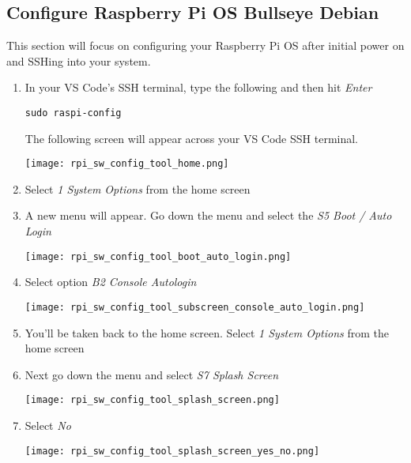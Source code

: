 \documentclass[journal]{IEEEtran}
\begin{document}
    \subsection{Configure Raspberry Pi OS Bullseye Debian}

    This section will focus on configuring your Raspberry Pi OS after initial power on and SSHing into your system. \newline

    \begin{enumerate}
        \item In your VS Code's SSH terminal, type the following and then hit \emph{Enter}
        
        \begin{lstlisting}[frame=single]
            sudo raspi-config
        \end{lstlisting}

        The following screen will appear across your VS Code SSH terminal. \newline

        \texttt{[image: rpi\_sw\_config\_tool\_home.png]}

        \item Select \emph{1 System Options} from the home screen

        \item A new menu will appear. Go down the menu and select the \emph{S5 Boot / Auto Login}
        
        \texttt{[image: rpi\_sw\_config\_tool\_boot\_auto\_login.png]}

        \item Select option \emph{B2 Console Autologin}
        
        \texttt{[image: rpi\_sw\_config\_tool\_subscreen\_console\_auto\_login.png]}

        \item You'll be taken back to the home screen. Select \emph{1 System Options} from the home screen

        \item Next go down the menu and select \emph{S7 Splash Screen}
        
        \texttt{[image: rpi\_sw\_config\_tool\_splash\_screen.png]}

        \item Select \emph{No}
        
        \texttt{[image: rpi\_sw\_config\_tool\_splash\_screen\_yes\_no.png]}


\end{enumerate}
\end{document}
